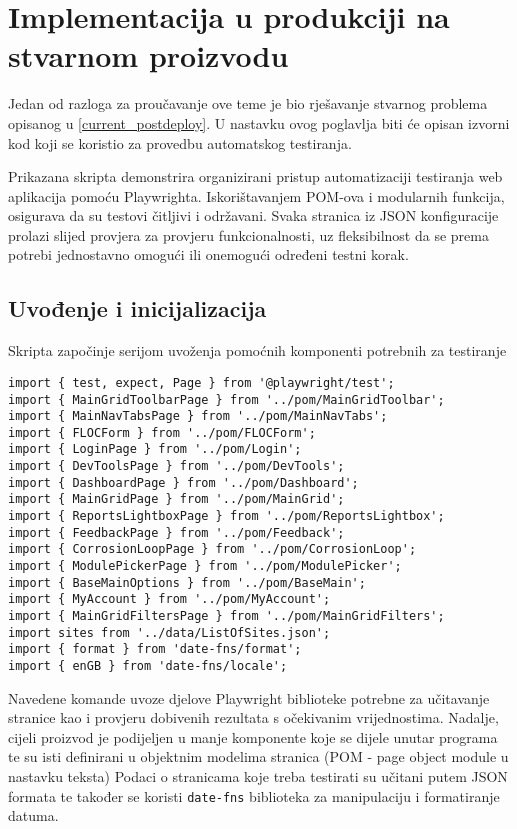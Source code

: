 \chapter{Implementacija u produkciji na stvarnom proizvodu}\label{ch:implementacija}

Jedan od razloga za proučavanje ove teme je bio rješavanje stvarnog problema opisanog u \ref{current_postdeploy}.
U nastavku ovog poglavlja biti će opisan izvorni kod koji se koristio za provedbu automatskog testiranja.

Prikazana skripta demonstrira organizirani pristup automatizaciji testiranja web aplikacija pomoću Playwrighta. Iskorištavanjem POM-ova i modularnih funkcija, osigurava da su testovi čitljivi i održavani. Svaka stranica iz JSON konfiguracije prolazi slijed provjera za provjeru funkcionalnosti, uz fleksibilnost da se prema potrebi jednostavno omogući ili onemogući određeni testni korak.

\section{Uvođenje i inicijalizacija}
Skripta započinje serijom uvoženja pomoćnih komponenti potrebnih za testiranje
\begin{verbatim}
import { test, expect, Page } from '@playwright/test';
import { MainGridToolbarPage } from '../pom/MainGridToolbar';
import { MainNavTabsPage } from '../pom/MainNavTabs';
import { FLOCForm } from '../pom/FLOCForm';
import { LoginPage } from '../pom/Login';
import { DevToolsPage } from '../pom/DevTools';
import { DashboardPage } from '../pom/Dashboard';
import { MainGridPage } from '../pom/MainGrid';
import { ReportsLightboxPage } from '../pom/ReportsLightbox';
import { FeedbackPage } from '../pom/Feedback';
import { CorrosionLoopPage } from '../pom/CorrosionLoop';
import { ModulePickerPage } from '../pom/ModulePicker';
import { BaseMainOptions } from '../pom/BaseMain';
import { MyAccount } from '../pom/MyAccount';
import { MainGridFiltersPage } from '../pom/MainGridFilters';
import sites from '../data/ListOfSites.json';
import { format } from 'date-fns/format';
import { enGB } from 'date-fns/locale';
\end{verbatim}

Navedene komande uvoze djelove Playwright biblioteke potrebne za učitavanje stranice kao i provjeru dobivenih rezultata s očekivanim vrijednostima.
Nadalje, cijeli proizvod je podijeljen u manje komponente koje se dijele unutar programa te su isti definirani u objektnim modelima stranica (POM - page object module u nastavku teksta)
Podaci o stranicama koje treba testirati su učitani putem JSON formata te također se koristi \texttt{date-fns} biblioteka za manipulaciju i formatiranje datuma.

